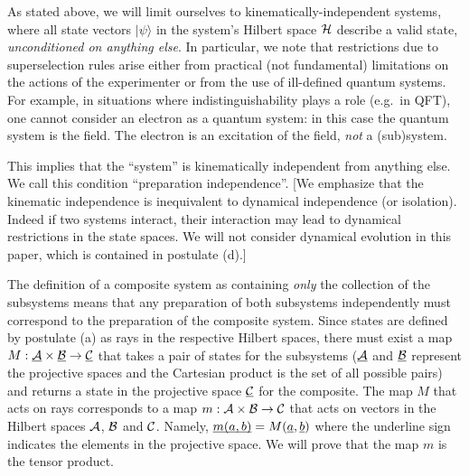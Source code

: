 \documentclass[aps,prl,amsmath,amssymb,twocolumn,nofootinbib]{revtex4}
\theoremstyle{plain}
\theoremstyle{definition}
\theoremstyle{remark}
\newcommand{\pj}[1] {\underbar{$#1$}}
\def\>{\rangle}
\def\commentg#1{ [{\bf Comment Gabriele:} {\sf #1}]}
\def\togli#1{}
\begin{document}
	\togli{This axiomatization implicitly contains a definition of ``quantum
		system'' which is crucial for what follows, so we need to clarify the
		assumptions that it contains. We will use the following definition for
		a quantum system\togli{$\stackon[1pt]={\mbox{\tiny
					def}}$}$\stackrel{\mbox{\tiny def}}=${\em ``a quantum degree of
			freedom with $d$ (possibly discrete, or continuous, infinite)
			mutually exclusive (commuting) values for each of its properties.
			Its mathematical description is through a Hilbert space of dimension
			$d$ which contains all the states that describe the values of its
			possible properties. In accordance with the postulate (a), these
			values correspond to a basis of the space, given by the eigenvectors
			of the observable corresponding to that property''}. \commentg{We may have to revise to be more clear. Where is this used?} }
	As stated
	above, we will limit ourselves to kinematically-independent systems,
	where all state vectors $|\psi\>$ in the system's Hilbert space $\cal H$
	describe a valid state, {\em unconditioned on anything else}. In
	particular, we note that restrictions due to superselection rules
	arise either from practical (not fundamental) limitations on the
	actions of the experimenter \cite{susskind,zanardi,zanardilloyd} or
	from the use of ill-defined quantum systems. For example, in
	situations where indistinguishability plays a role (e.g.~in QFT), one
	cannot consider an electron as a quantum system: in this case the
	quantum system is the field. The electron is an excitation of the
	field, {\em not} a (sub)system.
	
	This implies that the ``system'' is kinematically independent from
	anything else.  We call this condition ``preparation independence''.
	[We emphasize that the kinematic independence is inequivalent to
	dynamical independence (or isolation).  Indeed if two systems
	interact, their interaction may lead to dynamical restrictions in the
	state spaces. We will not consider dynamical evolution in this paper,
	which is contained in postulate (d).]
	
	The definition of a composite system as containing {\em only} the
	collection of the subsystems means that any preparation of both
	subsystems independently must correspond to the preparation of the
	composite system. Since states are defined by postulate (a) as rays in
	the respective Hilbert spaces, there must exist a map $M : \pj{\cal A}
	\times \pj{\cal B } \to \pj{\cal C}$ that takes a pair of states for
	the subsystems ($\pj{\cal A}$ and $\pj{\cal B }$ represent the
	projective spaces and the Cartesian product is the set of all possible
	pairs) and returns a state in the projective space $\pj{\cal C}$ for
	the composite. The map $M$ that acts on rays corresponds to a map $m:{\cal A}\times{\cal B}\to{\cal C}$ that
	acts on vectors in the Hilbert spaces $\cal A$, $\cal B$ and $\cal C$.
	Namely, $\pj{m(a,b)}=M(\pj{a},\pj{b})$ where the underline sign
	indicates the elements in the projective space. We will prove that the
	map $m$ is the tensor product.
	
\end{document}
